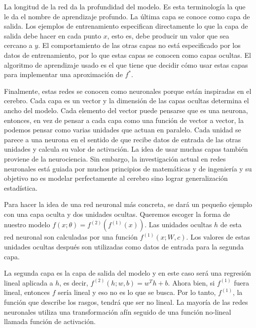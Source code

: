 \vspace{1em}

La longitud de la red da la profundidad del modelo. Es esta terminología la que le da el nombre de aprendizaje profundo. La última capa se conoce como capa de salida. Los ejemplos de entrenamiento especifican directamente lo que la capa de salida debe hacer en cada punto $x$, esto es, debe producir un valor que sea cercano a $y$. El comportamiento de las otras capas no está especificado por los datos de entrenamiento, por lo que estas capas se conocen como capas ocultas. El algoritmo de aprendizaje usado es el que tiene que decidir cómo usar estas capas para implementar una aproximación de $f^*$.

\vspace{1em}

Finalmente, estas redes se conocen como neuronales porque están inspiradas en el cerebro. Cada capa es un vector y la dimensión de las capas ocultas determina el ancho del modelo. Cada elemento del vector puede pensarse que es una neurona, entonces, en vez de pensar a cada capa como una función de vector a vector, la podemos pensar como varias unidades que actuan en paralelo. Cada unidad se parece a una neurona en el sentido de que recibe datos de entrada de las otras unidades y calcula su valor de activación. La idea de usar muchas capas también proviene de la neurociencia. Sin embargo, la investigación actual en redes neuronales está guiada por muchos principios de matemáticas y de ingeniería y su objetivo no es modelar perfectamente al cerebro sino lograr generalización estadística.
\cite{goodfellow-et-al-2016}

\vspace{1em}

Para hacer la idea de una red neuronal más concreta, se dará un pequeño ejemplo con una capa oculta y dos unidades ocultas. Queremos escoger la forma de nuestro modelo $f(x;\theta) = f^{(2)}(f^{(1)}(x))$. Las unidades ocultas $h$ de esta red neuronal son calculadas por una función $f^{(1)}(x;W,c)$. Los valores de estas unidades ocultas después son utilizadas como datos de entrada para la segunda capa. 

\vspace{1em}

La segunda capa es la capa de salida del modelo y en este caso será una regresión lineal aplicada a $h$, es decir, $f^{(2)}(h;w,b) = w^Th + b$. Ahora bien, si $f^{(1)}$ fuera lineal, entonces $f$ sería lineal y eso no es lo que se busca. Por lo tanto, $f^{(1)}$, la función que describe los rasgos, tendrá que ser no lineal. La mayoría de las redes neuronales utiliza una transformación afín seguido de una función no-lineal llamada función de activación. 
\cite{goodfellow-et-al-2016}

